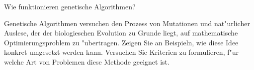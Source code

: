 \begin{aufgabe}
Wie funktionieren genetische Algorithmen?
\end{aufgabe}

{\parindent 0pt Genetische}
Algorithmen versuchen den Prozess von Mutationen und
nat"urlicher Auslese, der der biologieschen Evolution zu Grunde
liegt, auf mathematische Optimierungsproblem zu "ubertragen. 
Zeigen Sie an Beispieln, wie diese Idee konkret umgesetzt werden 
kann. Versuchen Sie Kriterien zu formulieren, f"ur welche Art von
Problemen diese Methode geeignet ist.
